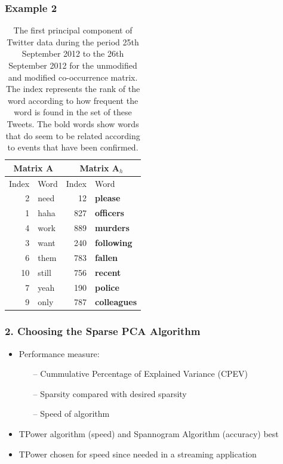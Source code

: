\documentclass{beamer}
\begin{document}
\begin{frame}
\frametitle{Example 2}
\begin{table}
\center
\begin{tabular}{| r | l | r | l|}
\hline
\multicolumn{2}{|c|}{Matrix $\mathbf{A}$ }& \multicolumn{2}{|c|}{Matrix $\mathbf{A}_h$} \\
\hline
Index & Word &Index & Word \\
\hline
2 & need & 12 & \textbf{please} \\
1 & haha & 827 & \textbf{officers}  \\
4 & work &889 & \textbf{murders}  \\
3 & want & 240 & \textbf{following} \\
6 & them & 783 & \textbf{fallen}\\
10 & still & 756 & \textbf{recent}\\ 
7 & yeah&190 & \textbf{police}  \\ 
9 & only & 787 & \textbf{colleagues}  \\
\hline
\end{tabular}
\caption{The first principal component of Twitter data during the period 25th September 2012 to the 26th September 2012 for the unmodified and modified co-occurrence matrix. The index represents the rank of the word according to how frequent the word is found in the set of these Tweets. The bold words show words that do seem to be related according to events that have been confirmed.}
\end{table}
\end{frame}

\begin{frame}
\frametitle{2. Choosing the Sparse PCA Algorithm}
\begin{itemize}
\item Performance measure:
\begin{itemize}
\item[--] Cummulative Percentage of Explained Variance (CPEV)
\item[--] Sparsity compared with desired sparsity
\item[--] Speed of algorithm
\end{itemize}
\item TPower algorithm (speed) and Spannogram Algorithm (accuracy) best
\item TPower chosen for speed since needed in a streaming application 
\end{itemize} 
\end{frame}
\end{document}
